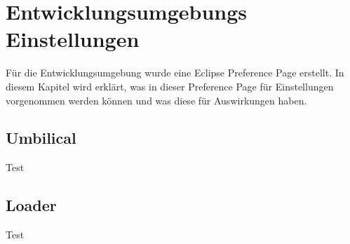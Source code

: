 \chapter{Entwicklungsumgebungs Einstellungen}
Für die Entwicklungsumgebung wurde eine Eclipse Preference Page erstellt. In diesem Kapitel wird erklärt, was in dieser Preference Page für Einstellungen vorgenommen werden können und was diese für Auswirkungen haben.
\section{Umbilical}
Test
\section{Loader}
Test
